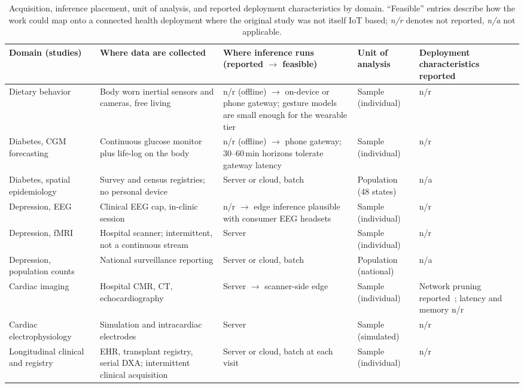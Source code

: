\documentclass[journal]{IEEEtran}
\newif\ifsubmission
\begin{document}
\ifsubmission\else
\begin{table}[t]
\centering
\caption{Acquisition, inference placement, unit of analysis, and reported deployment characteristics by domain. ``Feasible'' entries describe how the work could map onto a connected health deployment where the original study was not itself IoT based; \emph{n/r} denotes not reported, \emph{n/a} not applicable.}
\label{tab:iot-placement}
\scriptsize
\setlength{\tabcolsep}{3.5pt}
\renewcommand{\arraystretch}{1.15}
\begin{tabularx}{\textwidth}{>{\raggedright\arraybackslash}p{2.3cm} >{\raggedright\arraybackslash}p{3.1cm} >{\raggedright\arraybackslash}X >{\raggedright\arraybackslash}p{1.9cm} >{\raggedright\arraybackslash}p{2.9cm}}
\toprule
\textbf{Domain (studies)} & \textbf{Where data are collected} & \textbf{Where inference runs (reported $\rightarrow$ feasible)} & \textbf{Unit of analysis} & \textbf{Deployment characteristics reported} \\
\midrule
Dietary behavior~\cite{Rouast2020IntakeGesture,Kyritsis2019EatingBehavior} & Body worn inertial sensors and cameras, free living & n/r (offline) $\rightarrow$ on-device or phone gateway; gesture models are small enough for the wearable tier & Sample (individual) & n/r \\
\addlinespace[2pt]
\rowcolor{tablestripe}Diabetes, CGM forecasting~\cite{Li2020GluNet,Lim2025VirtualCGM} & Continuous glucose monitor plus life-log on the body & n/r (offline) $\rightarrow$ phone gateway; 30--60\,min horizons tolerate gateway latency & Sample (individual) & n/r \\
\addlinespace[2pt]
Diabetes, spatial epidemiology~\cite{XiaoLi2016DiabetesSpatiotemporal} & Survey and census registries; no personal device & Server or cloud, batch & Population (48 states) & n/a \\
\addlinespace[2pt]
\rowcolor{tablestripe}Depression, EEG~\cite{2} & Clinical EEG cap, in-clinic session & n/r $\rightarrow$ edge inference plausible with consumer EEG headsets & Sample (individual) & n/r \\
\addlinespace[2pt]
Depression, fMRI~\cite{4,9} & Hospital scanner; intermittent, not a continuous stream & Server & Sample (individual) & n/r \\
\addlinespace[2pt]
\rowcolor{tablestripe}Depression, population counts~\cite{3} & National surveillance reporting & Server or cloud, batch & Population (national) & n/a \\
\addlinespace[2pt]
Cardiac imaging~\cite{5,6} & Hospital CMR, CT, echocardiography & Server $\rightarrow$ scanner-side edge & Sample (individual) & Network pruning reported~\cite{5}; latency and memory n/r \\
\addlinespace[2pt]
\rowcolor{tablestripe}Cardiac electrophysiology~\cite{7} & Simulation and intracardiac electrodes & Server & Sample (simulated) & n/r \\
\addlinespace[2pt]
Longitudinal clinical and registry~\cite{lin2022deep,nitski2021long,glaser2022deep} & EHR, transplant registry, serial DXA; intermittent clinical acquisition & Server or cloud, batch at each visit & Sample (individual) & n/r \\
\bottomrule
\end{tabularx}
\end{table}
\end{document}
